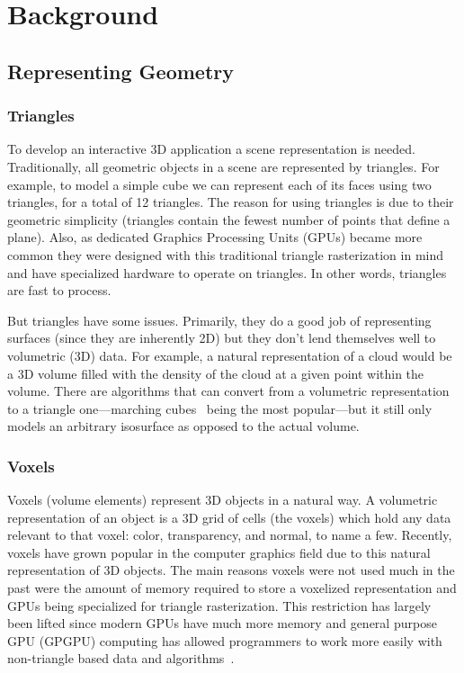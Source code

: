 \chapter{Background}

\section{Representing Geometry}
\subsection{Triangles}
To develop an interactive 3D application a scene representation is needed. Traditionally, all geometric objects in a scene are represented by triangles. For example, to model a simple cube we can represent each of its faces using two triangles, for a total of 12 triangles. The reason for using triangles is due to their geometric simplicity (triangles contain the fewest number of points that define a plane). Also, as dedicated Graphics Processing Units (GPUs) became more common they were designed with this traditional triangle rasterization in mind and have specialized hardware to operate on triangles. In other words, triangles are fast to process.

But triangles have some issues. Primarily, they do a good job of representing surfaces (since they are inherently 2D) but they don't lend themselves well to volumetric (3D) data. For example, a natural representation of a cloud would be a 3D volume filled with the density of the cloud at a given point within the volume. There are algorithms that can convert from a volumetric representation to a triangle one---marching cubes~\cite{Lorensen:1987:MCH:37402.37422} being the most popular---but it still only models an arbitrary isosurface as opposed to the actual volume.

\subsection{Voxels}
Voxels (volume elements) represent 3D objects in a natural way. A volumetric representation of an object is a 3D grid of cells (the voxels) which hold any data relevant to that voxel: color, transparency, and normal, to name a few. Recently, voxels have grown popular in the computer graphics field due to this natural representation of 3D objects. The main reasons voxels were not used much in the past were the amount of memory required to store a voxelized representation and GPUs being specialized for triangle rasterization. This restriction has largely been lifted since modern GPUs have much more memory and general purpose GPU (GPGPU) computing has allowed programmers to work more easily with non-triangle based data and algorithms~\cite{Crassin:2009:GRS:1507149.1507152,crassin2012dynamic}.

